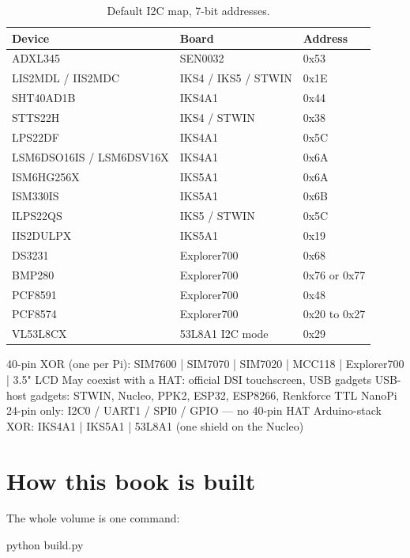 \begin{table}[H]\centering\small
\begin{tabular}{p{50mm}p{50mm}p{40mm}}
\toprule
Device & Board & Address \\
\midrule
ADXL345 & SEN0032 & 0x53 \\
LIS2MDL / IIS2MDC & IKS4 / IKS5 / STWIN & 0x1E \\
SHT40AD1B & IKS4A1 & 0x44 \\
STTS22H & IKS4 / STWIN & 0x38 \\
LPS22DF & IKS4A1 & 0x5C \\
LSM6DSO16IS / LSM6DSV16X & IKS4A1 & 0x6A \\
ISM6HG256X & IKS5A1 & 0x6A \\
ISM330IS & IKS5A1 & 0x6B \\
ILPS22QS & IKS5 / STWIN & 0x5C \\
IIS2DULPX & IKS5A1 & 0x19 \\
DS3231 & Explorer700 & 0x68 \\
BMP280 & Explorer700 & 0x76 or 0x77 \\
PCF8591 & Explorer700 & 0x48 \\
PCF8574 & Explorer700 & 0x20 to 0x27 \\
VL53L8CX & 53L8A1 I2C mode & 0x29 \\
\bottomrule
\end{tabular}
\caption{Default I2C map, 7-bit addresses.}
\end{table}

\begin{asciiart}
40-pin XOR (one per Pi):  SIM7600 | SIM7070 | SIM7020 | MCC118 | Explorer700 | 3.5" LCD
May coexist with a HAT:   official DSI touchscreen, USB gadgets
USB-host gadgets:         STWIN, Nucleo, PPK2, ESP32, ESP8266, Renkforce TTL
NanoPi 24-pin only:       I2C0 / UART1 / SPI0 / GPIO --- no 40-pin HAT
Arduino-stack XOR:        IKS4A1 | IKS5A1 | 53L8A1  (one shield on the Nucleo)
\end{asciiart}

\section*{How this book is built}

The whole volume is one command:

\begin{shellcode}
python build.py
\end{shellcode}

